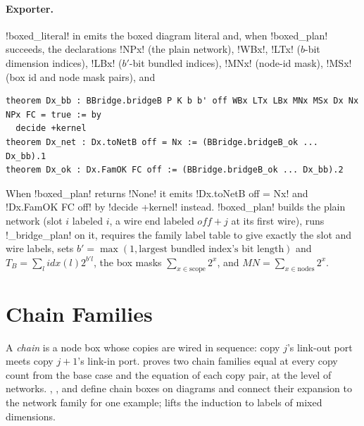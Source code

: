 {\paragraph{Exporter.} \py!boxed_literal! in  emits the boxed diagram literal and, when \py!boxed_plan! succeeds, the declarations \lbx!NPx! (the plain network), \lbx!WBx!, \lbx!LTx! ($b$-bit dimension indices), \lbx!LBx! ($b'$-bit bundled indices), \lbx!MNx! (node-id mask), \lbx!MSx! (box id and node mask pairs), and
\begin{lstlisting}[style=leanbox]
theorem Dx_bb : BBridge.bridgeB P K b b' off WBx LTx LBx MNx MSx Dx Nx NPx FC = true := by
  decide +kernel
theorem Dx_net : Dx.toNetB off = Nx := (BBridge.bridgeB_ok ... Dx_bb).1
theorem Dx_ok : Dx.FamOK FC off := (BBridge.bridgeB_ok ... Dx_bb).2
\end{lstlisting}
When \py!boxed_plan! returns \py!None! it emits \lbx!Dx.toNetB off = Nx! and \lbx!Dx.FamOK FC off! by \lbx!decide +kernel! instead. \py!boxed_plan! builds the plain network (slot $i$ labeled $i$, a wire end labeled $\mathit{off}+j$ at its first wire), runs \py!_bridge_plan! on it, requires the family label table to give exactly the slot and wire labels, sets $b'=\max(1,\text{largest bundled index's bit length})$ and $T_B=\sum_l \mathit{idx}(l)2^{b'l}$, the box masks $\sum_{x\in\text{scope}}2^x$, and $\mathit{MN}=\sum_{x\in\text{nodes}}2^x$.

\section{Chain Families}\label{sec:boxes-chain}

A \emph{chain} is a node box whose copies are wired in sequence: copy $j$'s link-out port meets copy $j+1$'s link-in port.  proves two chain families equal at every copy count from the base case and the equation of each copy pair, at the level of networks. , , and  define chain boxes on diagrams and connect their expansion to the network family for one example;  lifts the induction to labels of mixed dimensions.

}
